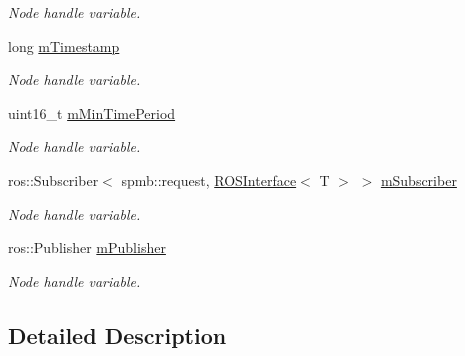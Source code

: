 \begin{DoxyCompactItemize}
\begin{DoxyCompactList}\small\item\em Node handle variable. \end{DoxyCompactList}\item 
long \hyperlink{classSPMB_1_1ROSInterface_a66af2aff77df71c0e937ce713117cac4}{m\+Timestamp}\hypertarget{classSPMB_1_1ROSInterface_a66af2aff77df71c0e937ce713117cac4}{}\label{classSPMB_1_1ROSInterface_a66af2aff77df71c0e937ce713117cac4}

\begin{DoxyCompactList}\small\item\em Node handle variable. \end{DoxyCompactList}\item 
uint16\+\_\+t \hyperlink{classSPMB_1_1ROSInterface_a7a7df0454febf2d53aab44d82e3e2e15}{m\+Min\+Time\+Period}\hypertarget{classSPMB_1_1ROSInterface_a7a7df0454febf2d53aab44d82e3e2e15}{}\label{classSPMB_1_1ROSInterface_a7a7df0454febf2d53aab44d82e3e2e15}

\begin{DoxyCompactList}\small\item\em Node handle variable. \end{DoxyCompactList}\item 
ros\+::\+Subscriber$<$ spmb\+::request, \hyperlink{classSPMB_1_1ROSInterface}{R\+O\+S\+Interface}$<$ T $>$ $>$ \hyperlink{classSPMB_1_1ROSInterface_af5455e14f031904eef29a49248a77c7a}{m\+Subscriber}\hypertarget{classSPMB_1_1ROSInterface_af5455e14f031904eef29a49248a77c7a}{}\label{classSPMB_1_1ROSInterface_af5455e14f031904eef29a49248a77c7a}

\begin{DoxyCompactList}\small\item\em Node handle variable. \end{DoxyCompactList}\item 
ros\+::\+Publisher \hyperlink{classSPMB_1_1ROSInterface_a26a3aac13b059a5fe61d73beb81ca040}{m\+Publisher}\hypertarget{classSPMB_1_1ROSInterface_a26a3aac13b059a5fe61d73beb81ca040}{}\label{classSPMB_1_1ROSInterface_a26a3aac13b059a5fe61d73beb81ca040}

\begin{DoxyCompactList}\small\item\em Node handle variable. \end{DoxyCompactList}\end{DoxyCompactItemize}


\subsection{Detailed Description}
